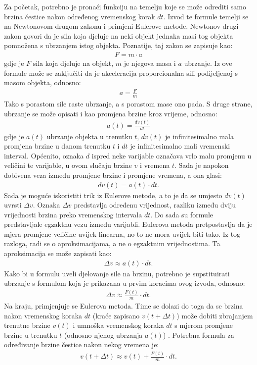 \documentclass{foi}
\begin{document}
 Za početak, potrebno je pronaći funkciju na temelju koje se može odrediti samo brzina čestice nakon određenog vremenskog korak $dt$. Izvod te formule temelji se na Newtonovom drugom zakonu i primjeni Eulerove metode. Newtonov drugi zakon govori da je sila koja djeluje na neki objekt jednaka masi tog objekta pomnožena s ubrzanjem istog objekta. Poznatije, taj zakon se zapisuje kao:
 \begin{align*}
F = m \cdot a
\end{align*}
gdje je $F$ sila koja djeluje na objekt, $m$ je njegova masa i $a$ ubrzanje. Iz ove formule može se zaključiti da je akceleracija proporcionalna sili podijeljenoj s masom objekta, odnosno:
 \begin{align*}
a = \frac{F}{m}
\end{align*}
Tako s porastom sile raste ubrzanje, a s porastom mase ono pada.  S druge strane, ubrzanje se može opisati i kao promjena brzine kroz vrijeme, odnosno:
 \begin{align*}
a(t) = \frac{dv(t)}{dt}
\end{align*}
gdje je $a(t)$ ubrzanje objekta u trenutku $t$, $dv(t)$ je infinitesimalno mala promjena brzine u danom trenutku $t$ i $dt$ je infinitesimalno mali vremenski interval. Općenito, oznaka $d$ ispred neke varijable označava vrlo malu promjenu u veličini te varijable, u ovom slučaju brzine $v$ i vremena $t$. Sada je napokon dobivena veza između promjene brzine i promjene vremena, a ona glasi:
 \begin{align*}
dv(t) = a(t) \cdot dt.
\end{align*}
Sada je moguće iskoristiti trik iz Eulerove metode, a to je da se umjesto $dv(t)$ uvrsti $\Delta v$. Oznaka $\Delta v$ predstavlja određenu vrijednost, razliku između dviju vrijednosti brzina preko vremenskog intervala $dt$. Do sada su formule predstavljale egzaktnu vezu između varijabli. Eulerova metoda pretpostavlja da je mjera promjene veličine uvijek linearna, no to ne mora uvijek biti tako. Iz tog razloga, radi se o aproksimacijama, a ne o egzaktnim vrijednostima. Ta aproksimacija se može zapisati kao:
 \begin{align*}
\Delta v \approx a(t) \cdot dt.
\end{align*}
Kako bi u formulu uveli djelovanje sile na brzinu, potrebno je supstituirati ubrzanje s formulom koja je prikazana u prvim koracima ovog izvoda, odnosno:
 \begin{align*}
\Delta v \approx \frac{F(t)}{m} \cdot dt.
\end{align*}
Na kraju, primjenjuje se Eulerova metoda. Time se dolazi do toga da se brzina nakon vremenskog koraka $dt$ (kraće zapisano $v(t + \Delta t)$) može dobiti zbrajanjem trenutne brzine $v(t)$ i umnoška vremenskog koraka $dt$ s mjerom promjene brzine u trenutku $t$ (odnosno njenog ubrzanja $a(t)$) \parencite{HjorthJensen2021}. Potrebna formula za određivanje brzine čestice nakon nekog vremena je:
 \begin{align*}
v(t + \Delta t) \approx v(t) + \frac{F(t)}{m} \cdot dt.
\end{align*}
\end{document}
